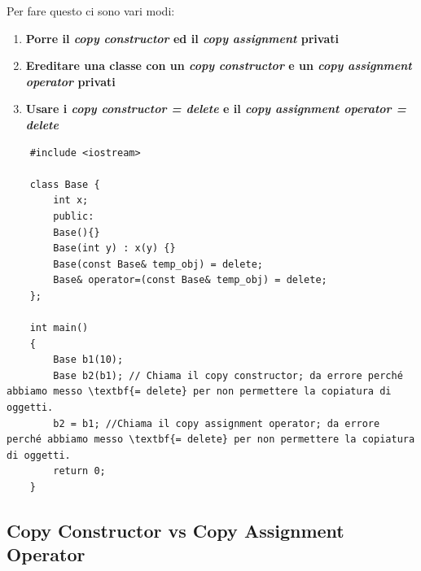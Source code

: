 \textsf{\small Per fare questo ci sono vari modi: } \\

\begin{enumerate}
	\item \textsf{\small \textbf{Porre il \emph{copy constructor} ed il \emph{copy assignment} privati} }
	\item \textsf{\small \textbf{Ereditare una classe con un \emph{copy constructor} e un \emph{copy assignment operator} privati} }
	\item \textsf{\small \textbf{Usare i \emph{copy constructor = delete} e il \emph{copy assignment operator = delete}}}
\end{enumerate}

\begin{lstlisting}
	#include <iostream>
	
	class Base {
		int x;
		public:
		Base(){}
		Base(int y) : x(y) {}
		Base(const Base& temp_obj) = delete;
		Base& operator=(const Base& temp_obj) = delete;
	};
	
	int main()
	{
		Base b1(10);
		Base b2(b1); // Chiama il copy constructor; da errore perché abbiamo messo \textbf{= delete} per non permettere la copiatura di oggetti.
		b2 = b1; //Chiama il copy assignment operator; da errore perché abbiamo messo \textbf{= delete} per non permettere la copiatura di oggetti.
		return 0;
	}
\end{lstlisting}

\subsection{Copy Constructor vs Copy Assignment Operator}

